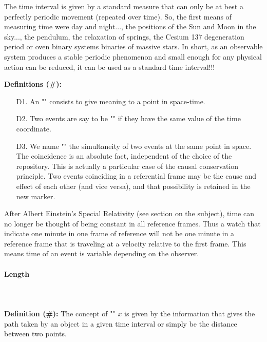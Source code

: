 	The time interval is given by a standard measure that can only be at best a perfectly periodic movement (repeated over time). So, the first means of measuring time were day and night..., the positions of the Sun and Moon in the sky..., the pendulum, the relaxation of springs, the Cesium 137 degeneration period or oven binary systems binaries of massive stars. In short, as an observable system produces a stable periodic phenomenon and small enough for any physical action can be reduced, it can be used as a standard time interval!!!
	
	\textbf{Definitions (\#\mydef):}
	\begin{enumerate}
		\item[D1.] An "" consists to give meaning to a point in space-time.

		\item[D2.] Two events are say to be "" if they have the same value of the time coordinate.

		\item[D3.] We name "" the simultaneity of two events at the same point in space. The coincidence is an absolute fact, independent of the choice of the repository. This is actually a particular case of the causal conservation principle. Two events coinciding in a referential frame may be the cause and effect of each other (and vice versa), and that possibility is retained in the new marker.
	\end{enumerate}
	
	After Albert Einstein's Special Relativity (see section on the subject), time can no longer be thought of being constant in all reference frames. Thus a watch that indicate one minute in one frame of reference will not be one minute in a reference frame that is traveling at a velocity relative to the first frame. This means time of an event is variable depending on the observer.
	
	\paragraph{Length}\mbox{}\\\\
	\textbf{Definition (\#\mydef):} The concept of "" $x$ is given by the information that gives the path taken by an object in a given time interval or simply be the distance between two points.
	
